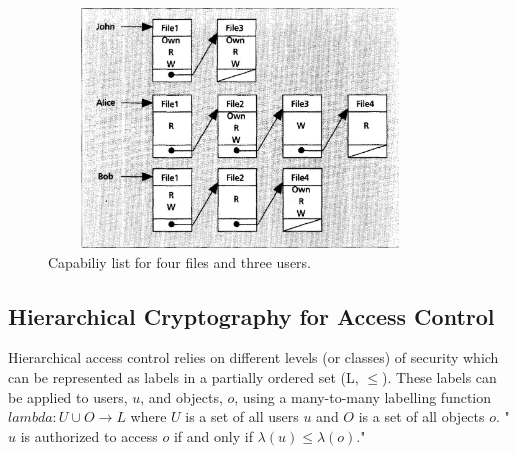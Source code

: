\documentclass[12pt, titlepage]{article}
\begin{document}
\begin{figure}
\centerline{\includegraphics[height=2.5in,width=4in,angle=0]{capabilities.pdf}}
\caption{Capabiliy list for four files and three users.\cite{accessControlPrinciples}}
\label{fig:capabilities}
\end{figure}

\subsection{Hierarchical Cryptography for Access Control}
Hierarchical access control relies on different levels (or classes) of security which can be represented as labels in a partially ordered set (L, $≤$). These labels can be applied to users, $u$, and objects, $o$, using a many-to-many labelling function $lambda : U ∪ O → L$ where $U$ is a set of all users $u$ and $O$ is a set of all objects $o$. "$u$ is authorized to access $o$ if and only if $\lambda(u)≤\lambda(o)$\cite{mainPaper}."
\end{document}
